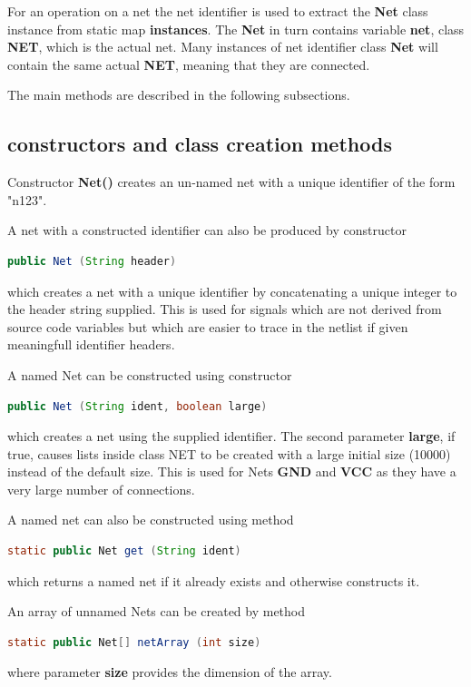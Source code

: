 For an operation on a net the net identifier is used to extract the
{\bf Net} class instance from static map {\bf instances}. The {\bf Net}
in turn contains variable {\bf net}, class {\bf NET}, which is the
actual net. Many instances of net identifier class {\bf Net} will
contain the same actual {\bf NET}, meaning that they are connected.

The main methods are described in the following subsections.

\subsection{constructors and class creation methods}

    Constructor {\bf Net()} creates an un-named net with a unique
    identifier of the form "n123".

    A net with a constructed identifier can also be produced by
    constructor
    \begin{lstlisting}[gobble=4, language=java]
        public Net (String header)
    \end{lstlisting}
    which creates a net with a unique identifier by concatenating a
    unique integer to the header string supplied. This is used for
    signals which are not derived from source code variables but which
    are easier to trace in the netlist if given meaningfull identifier
    headers.

    A named Net can be constructed using constructor
    \begin{lstlisting}[gobble=4, language=java]
        public Net (String ident, boolean large)
    \end{lstlisting}
    which creates a net using the supplied identifier. The second
    parameter {\bf large}, if true, causes lists inside class
    NET to be created with a large initial size (10000) instead of the
    default size. This is used for Nets {\bf GND} and {\bf VCC} as they have
    a very large number of connections.

    A named net can also be constructed using method
    \begin{lstlisting}[gobble=4, language=java]
        static public Net get (String ident)
    \end{lstlisting}
    which returns a named net if it already exists and otherwise
    constructs it.

    An array of unnamed Nets can be created by method
    \begin{lstlisting}[gobble=4, language=java]
        static public Net[] netArray (int size)
    \end{lstlisting}
    where parameter {\bf size} provides the dimension of the array.

